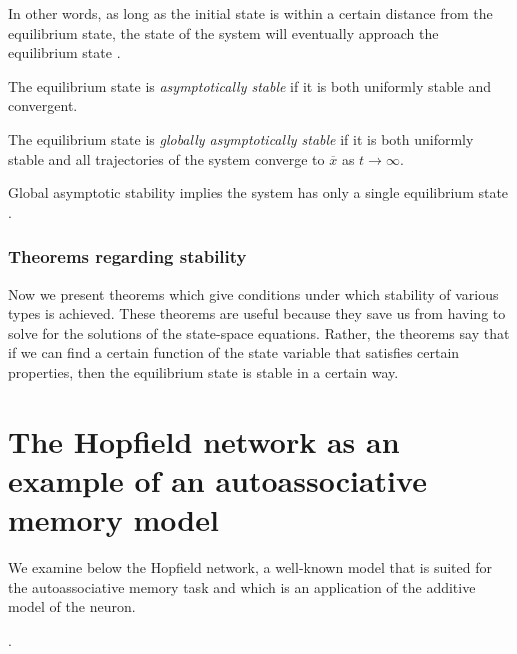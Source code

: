 In other words, as long as the initial state is within a certain distance from the equilibrium state, the state of the system will eventually approach the equilibrium state \cite[p. 681]{Haykin:2009:NNC:1213811}.

\begin{definition}
  The equilibrium state is \emph{asymptotically stable} if it is both uniformly stable and convergent.
  \cite{wilson2010}
\end{definition}

\begin{definition}
  The equilibrium state is \emph{globally asymptotically stable} if it is both uniformly stable and all trajectories of the system converge to $\overline{x}$ as $t \to \infty$.
  \cite{wilson2010}
\end{definition}

Global asymptotic stability implies the system has only a single equilibrium state \cite[p. 681]{Haykin:2009:NNC:1213811}.

\subsubsection{Theorems regarding stability}

Now we present theorems which give conditions under which stability of various types is achieved. These theorems are useful because they save us from having to solve for the solutions of the state-space equations. Rather, the theorems say that if we can find a certain function of the state variable that satisfies certain properties, then the equilibrium state is stable in a certain way.

\section{The Hopfield network as an example of an autoassociative memory model}

We examine below the Hopfield network, a well-known model that is suited for the autoassociative memory task and which is an application of the additive model of the neuron.

\cite{Yegnanarayana:2004:ANN:1197006}.

